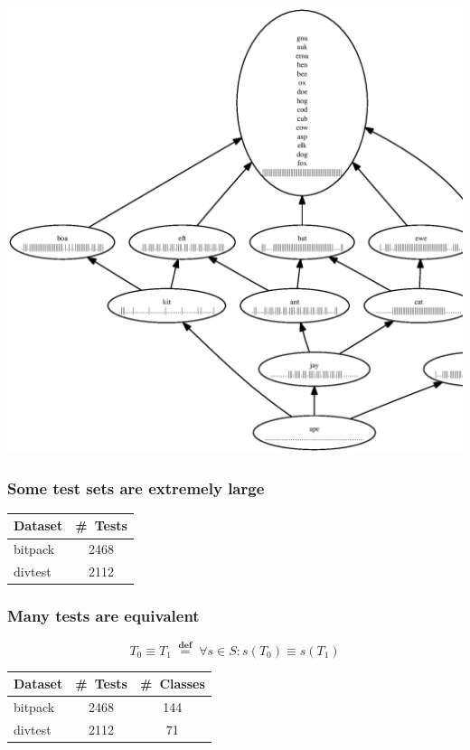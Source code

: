 \documentclass[svgnames,14pt]{beamer}
\newcommand\defined{\mathrel{\;\stackrel{\scriptscriptstyle\mathbf{def}}{=}\;}}
\theoremstyle{definition}
\begin{document}
\begin{frame}
\centerline{\includegraphics[height=0.9\textheight]{fail.ps}}
\end{frame}

\begin{frame}
\frametitle{Some test sets are extremely large}
\begin{tabular}{ | l | c | }
\hline
Dataset & \#~Tests \\ 
\hline
bitpack & 2468 \\
divtest & 2112 \\
\hline
\end{tabular}
\end{frame}

\begin{frame}
\frametitle{Many tests are equivalent}
\begin{block}{}
$$ T_0 \equiv T_1 \defined \forall s \in S : s(T_0) \equiv s(T_1) $$
\end{block}
\end{frame}

\begin{frame}
\def\?{\phantom0}
\begin{tabular}{ | l | c | c | }
\hline
Dataset & \#~Tests & \#\ Classes\\ 
\hline
bitpack & 2468 & 144 \\
divtest & 2112 & \?71\\
\hline
\end{tabular}
\end{frame}
\end{document}
